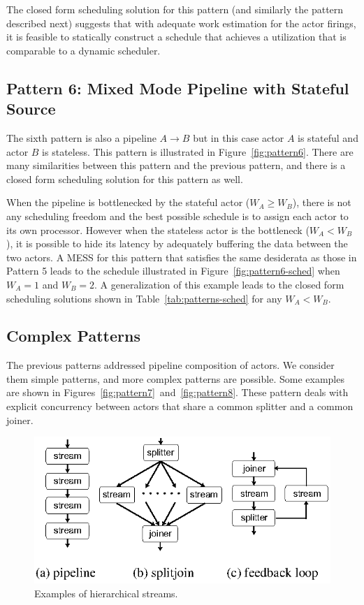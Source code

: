 The closed form scheduling solution for this pattern (and similarly
the pattern described next) suggests that with adequate work
estimation for the actor firings, it is feasible to statically
construct a schedule that achieves a utilization that is comparable to
a dynamic scheduler.

\subsection{Pattern 6: Mixed Mode Pipeline with Stateful Source}

The sixth pattern is also a pipeline $A\rightarrow B$ but in this case
actor $A$ is stateful and actor $B$ is stateless. This pattern is
illustrated in Figure~\ref{fig:pattern6}. There are many similarities
between this pattern and the previous pattern, and there is a closed
form scheduling solution for this pattern as well. 

When the pipeline is bottlenecked by the stateful actor ($W_A \ge
W_B$), there is not any scheduling freedom and the best possible
schedule is to assign each actor to its own processor. However when
the stateless actor is the bottleneck ($W_A < W_B$), it is possible to
hide its latency by adequately buffering the data between the two
actors. A MESS for this pattern that satisfies the same desiderata as
those in Pattern 5 leads to the schedule illustrated in
Figure~\ref{fig:pattern6-sched} when $W_A = 1$ and $W_B = 2$.  A
generalization of this example leads to the closed form scheduling
solutions shown in Table~\ref{tab:patterns-sched} for any $W_A < W_B$.

\subsection{Complex Patterns}

The previous patterns addressed pipeline composition of actors. We
consider them simple patterns, and more complex patterns are
possible. Some examples are shown in
Figures~\ref{fig:pattern7}~and~\ref{fig:pattern8}. These pattern deals
with explicit concurrency between actors that share a common splitter
and a common joiner.

\begin{figure}[t]
\begin{center}
 \includegraphics[scale=1, angle=0]{./constructs-eg.eps}
 \caption{Examples of hierarchical streams.}
 \label{fig:containers}
\end{center}
\end{figure}

